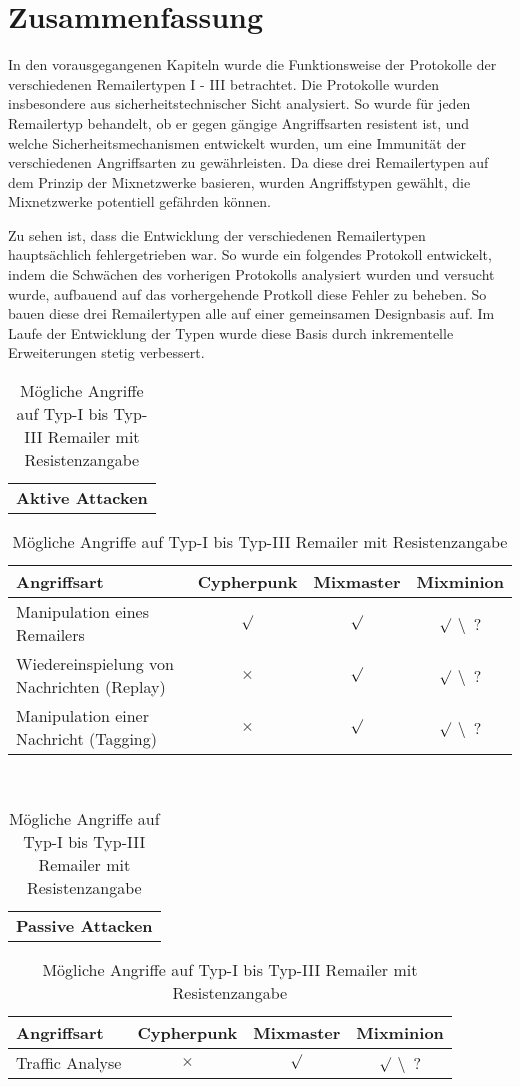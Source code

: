 \chapter{Zusammenfassung}

In den vorausgegangenen Kapiteln wurde die Funktionsweise der Protokolle der verschiedenen Remailertypen I - III betrachtet. Die Protokolle wurden insbesondere aus sicherheitstechnischer Sicht analysiert. So wurde für jeden Remailertyp behandelt, ob er gegen gängige Angriffsarten resistent ist, und welche Sicherheitsmechanismen entwickelt wurden, um eine Immunität der verschiedenen Angriffsarten zu gewährleisten.  Da diese drei Remailertypen auf dem Prinzip der Mixnetzwerke basieren, wurden Angriffstypen gewählt, die Mixnetzwerke potentiell gefährden können.

Zu sehen ist, dass die Entwicklung der verschiedenen Remailertypen hauptsächlich fehlergetrieben war. So wurde ein folgendes Protokoll entwickelt, indem die Schwächen des vorherigen Protokolls analysiert wurden und versucht wurde, aufbauend auf das vorhergehende Protkoll diese Fehler zu beheben. So bauen diese drei Remailertypen alle auf einer gemeinsamen Designbasis auf. Im Laufe der Entwicklung der Typen wurde diese Basis durch inkrementelle Erweiterungen stetig verbessert.

\begin{table}[htbp]
	\centering
	\begin{tabular}{c}
		\textbf{Aktive Attacken}
	\end{tabular}
		
	\begin{tabular}{m{7.5cm} || c | c | c}
		\hline
		\textbf{Angriffsart} & \textbf{Cypherpunk} & \textbf{Mixmaster} & \textbf{Mixminion} \\
		\hline
		Manipulation eines Remailers & $\surd$ & $\surd$ & $\surd$ \textbackslash ~? \\
		Wiedereinspielung von Nachrichten (Replay) & $\times$ & $\surd$ & $\surd$ \textbackslash ~? \\
		Manipulation einer Nachricht (Tagging) & $\times$ & $\surd$ & $\surd$ \textbackslash ~? \\
	\end{tabular}

	~\\[1ex]

	\begin{tabular}{c}
		\textbf{Passive Attacken}
	\end{tabular}
	
	\begin{tabular}{m{7.5cm} || c | c | c}
		\hline
		\textbf{Angriffsart} & \textbf{Cypherpunk} & \textbf{Mixmaster} & \textbf{Mixminion} \\
		\hline
		Traffic Analyse & $\times$ & $\surd$ & $\surd$ \textbackslash ~? \\
	\end{tabular}

	\caption{Mögliche Angriffe auf Typ-I bis Typ-III Remailer mit Resistenzangabe}
\end{table}


